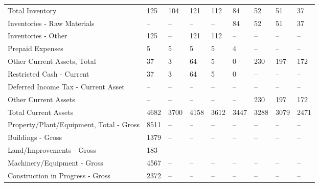 \documentclass[grad,numbers]{coppe}
\begin{document}
\begin{longtable}[t]{lllllllll}
  \hspace{1em}Total Inventory & 125 & 104 & 121 & 112 & 84 & 52 & 51 & 37\\
  \hspace{1em}\hspace{1em}Inventories - Raw Materials & -- & -- & -- & -- & 84 & 52 & 51 & 37\\
  \hspace{1em}\hspace{1em}Inventories - Other & 125 & -- & 121 & 112 & -- & -- & -- & --\\
  \hspace{1em}Prepaid Expenses & 5 & 5 & 5 & 5 & 4 & -- & -- & --\\
  \hspace{1em}Other Current Assets, Total & 37 & 3 & 64 & 5 & 0 & 230 & 197 & 172\\
  \hspace{1em}\hspace{1em}Restricted Cash - Current & 37 & 3 & 64 & 5 & 0 & -- & -- & --\\
  \hspace{1em}\hspace{1em}Deferred Income Tax - Current Asset & -- & -- & -- & -- & -- & -- & -- & --\\
  \hspace{1em}\hspace{1em}Other Current Assets & -- & -- & -- & -- & -- & 230 & 197 & 172\\
  \hspace{1em}Total Current Assets & 4682 & 3700 & 4158 & 3612 & 3447 & 3288 & 3079 & 2471\\
  \hspace{1em}Property/Plant/Equipment, Total - Gross & 8511 & -- & -- & -- & -- & -- & -- & --\\
  \hspace{1em}\hspace{1em}Buildings - Gross & 1379 & -- & -- & -- & -- & -- & -- & --\\
  \hspace{1em}\hspace{1em}Land/Improvements - Gross & 183 & -- & -- & -- & -- & -- & -- & --\\
  \hspace{1em}\hspace{1em}Machinery/Equipment - Gross & 4567 & -- & -- & -- & -- & -- & -- & --\\
  \hspace{1em}\hspace{1em}Construction in Progress - Gross & 2372 & -- & -- & -- & -- & -- & -- & --\\

\end{longtable}
\end{document}
